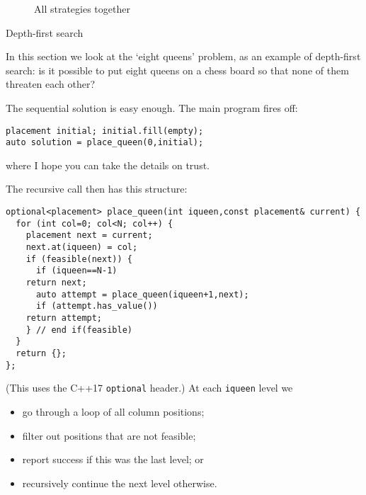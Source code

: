 \begin{figure}[t]
  \caption{All strategies together}
  \label{fig:omp-nbody4}
\end{figure}

 {Depth-first search}
\lstset{language=C++}

In this section we look at the `eight queens' problem, as an example of depth-first search:
is it possible to put eight queens on a chess board so that none of them threaten each other?

The sequential solution is easy enough.
The main program fires off:
\begin{lstlisting}
placement initial; initial.fill(empty);
auto solution = place_queen(0,initial);
\end{lstlisting}
where I hope you can take the details on trust.

The recursive call then has this structure:
\begin{lstlisting}
optional<placement> place_queen(int iqueen,const placement& current) {
  for (int col=0; col<N; col++) {
    placement next = current;
    next.at(iqueen) = col;
    if (feasible(next)) {
      if (iqueen==N-1)
	return next;
      auto attempt = place_queen(iqueen+1,next);
      if (attempt.has_value())
	return attempt;
    } // end if(feasible)
  }
  return {};
};
\end{lstlisting}
(This uses the C++17 \lstinline{optional} header.)
At each \lstinline{iqueen} level we
\begin{itemize}
\item go through a loop of all column positions;
\item filter out positions that are not feasible;
\item report success if this was the last level; or
\item recursively continue the next level otherwise.
\end{itemize}

